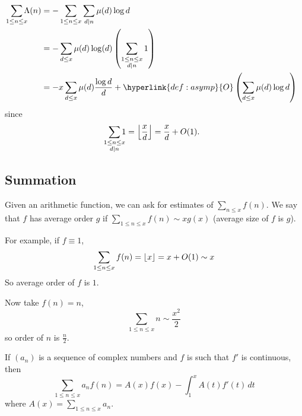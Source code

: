 \documentclass{article}
\DeclarePairedDelimiter\floor{\lfloor}{\rfloor}
\begin{document}
\begin{eg}
  \begin{align*}
    \sum_{\mathclap{1\leq n \leq x}}\Lambda(n) &= -\sum_{1\leq n\leq x}\sum_{d|n}\mu(d)\log d \\
                                    &= - \sum_{d\leq x}\mu(d)\log(d)\left(\sum_{\substack{1\leq n\leq x \\ d|n}}1\right) \\
                                    &= - x \sum_{d\leq x}\mu(d) \frac{\log d}{d} + \hyperlink{def:asymp}{O}\left(\sum_{d\leq x}\mu(d)\log d \right)
  \end{align*}
  since
  \begin{equation*}
    \sum_{\mathclap{\substack{1\leq n\leq x \\ d|n}}}1 = \floor*{\frac{x}{d}}= \frac{x}{d} + O(1).
  \end{equation*}
\end{eg}
\clearpage

\subsection{Summation}
Given an arithmetic function, we can ask for estimates of $\sum_{n \leq x} f(n)$.
We say that $f$ has average order $g$ if $\sum_{1 \leq n \leq x} f(n) \sim x g(x)$ (average size of $f$ is $g$).

For example, if $f \equiv 1$,
\begin{equation*}
  \sum_{1 \leq n \leq x} f(n) = \floor{x} = x + O(1) \sim x
\end{equation*}
So average order of $f$ is $1$.

Now take $f(n) = n$,
\begin{equation*}
  \sum_{1 \leq n \leq x} n \sim \frac{x^2}{2}
\end{equation*}
so order of $n$ is $\frac{n}{2}$.

\begin{nlemma}\label{lem:1}
  If $(a_n)$ is a sequence of complex numbers and $f$ is such that $f'$ is continuous, then
  \begin{equation*}
    \sum_{1 \leq n \leq x} a_n f(n) = A(x) f(x) - \int_1^x A(t) f'(t) \, dt
  \end{equation*}
  where $A(x) = \sum_{1 \leq n \leq x} a_n$.
\end{nlemma}
\end{document}
